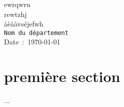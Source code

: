 \documentclass[a4paper, 11pt,titlepage]{article}
\begin{document}
\begin{center}
\Huge 
ewrqwru\\
rewtzhj\\
àèààvséjefwh\\[1.5cm]
\texttt{Nom du département}\\[1cm]  
\large 
Date~:~\today\\[1cm]
\end{center} 

\tableofcontents
\newpage

\section{première section}

...
\end{document}
